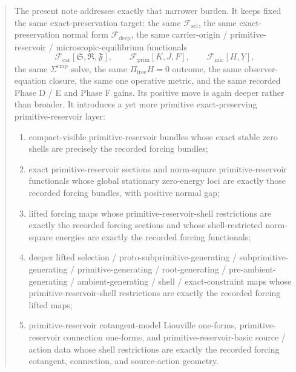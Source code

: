\documentclass[11pt]{article}
\newcommand{\GaugeAux}{Y}
\newcommand{\MicFunctional}{\mathscr F_{\mathrm{mic}}}
\newcommand{\PrimFunctional}{\mathscr F_{\mathrm{prim}}}
\newcommand{\CarrierFunctional}{\mathscr F_{\mathrm{car}}}
\newcommand{\DeepFunctional}{\mathscr F_{\mathrm{deep}}}
\newcommand{\StemFunctional}{\mathscr F_{\mathrm{sel}}}
\newcommand{\PrimStrain}{K}
\newcommand{\PrimNeutral}{J}
\newcommand{\PrimFree}{F}
\newcommand{\CarrierSeed}{\mathfrak S}
\newcommand{\RelabelSeed}{\mathfrak R}
\newcommand{\FreeSeed}{\mathfrak F}
\begin{document}
\begin{abstract}
The present note addresses exactly that narrower burden. It keeps fixed the same exact-preservation target: the same \(\StemFunctional\), the same exact-preservation normal form \(\DeepFunctional\), the same carrier-origin / primitive-reservoir / microscopic-equilibrium functionals
\[
\CarrierFunctional[\CarrierSeed,\RelabelSeed,\FreeSeed],\qquad
\PrimFunctional[\PrimStrain,\PrimNeutral,\PrimFree],\qquad
\MicFunctional[H,\GaugeAux],
\]
the same \(\Sigma^{\mathrm{cmp}}\) solve, the same \(\Pi_{\mathrm{free}}H=0\) outcome, the same observer-equation closure, the same one operative metric, and the same recorded Phase D / E and Phase F gains. Its positive move is again deeper rather than broader. It introduces a yet more primitive exact-preserving primitive-reservoir layer:
\begin{enumerate}
    \item compact-visible primitive-reservoir bundles whose exact stable zero shells are precisely the recorded forcing bundles;
    \item exact primitive-reservoir sections and norm-square primitive-reservoir functionals whose global stationary zero-energy loci are exactly those recorded forcing bundles, with positive normal gap;
    \item lifted forcing maps whose primitive-reservoir-shell restrictions are exactly the recorded forcing sections and whose shell-restricted norm-square energies are exactly the recorded forcing functionals;
    \item deeper lifted selection / proto-subprimitive-generating / subprimitive-generating / primitive-generating / root-generating / pre-ambient-generating / ambient-generating / shell / exact-constraint maps whose primitive-reservoir-shell restrictions are exactly the recorded forcing lifted maps;
    \item primitive-reservoir cotangent-model Liouville one-forms, primitive-reservoir connection one-forms, and primitive-reservoir-basic source / action data whose shell restrictions are exactly the recorded forcing cotangent, connection, and source-action geometry.
\end{enumerate}


\end{abstract}
\end{document}
